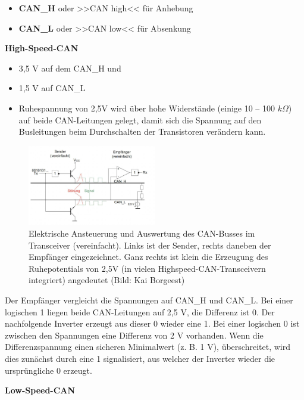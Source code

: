 \begin{itemize}
\item
  \textbf{CAN\_H} oder >>CAN high<< für Anhebung
\item
  \textbf{CAN\_L} oder >>CAN low<< für Absenkung
\end{itemize}

\newpage

\textbf{High-Speed-CAN}

\begin{itemize}
\item
  3,5 V auf dem CAN\_H und
\item
  1,5 V auf CAN\_L
\item
  Ruhespannung von 2,5V wird über hohe Widerstände (einige 10 -- 100
  $k\Omega$) auf beide CAN-Leitungen gelegt, damit sich die Spannung
  auf den Busleitungen beim Durchschalten der Transistoren verändern
  kann.
\end{itemize}

\begin{figure}[!ht]%
\centering
\includegraphics[width=0.5\textwidth]{images/CAN/CAN-6.pdf}
\caption{Elektrische Ansteuerung und Auswertung des CAN-Busses im
Transceiver (vereinfacht). Links ist der Sender, rechts daneben der
Empfänger eingezeichnet. Ganz rechts ist klein die Erzeugung des
Ruhepotentials von 2,5V (in vielen Highspeed-CAN-Transceivern
integriert) angedeutet (Bild: Kai Borgeest)}
\end{figure}

Der Empfänger vergleicht die Spannungen auf CAN\_H und CAN\_L. Bei einer
logischen 1 liegen beide CAN-Leitungen auf 2,5 V, die Differenz ist 0.
Der nachfolgende Inverter erzeugt aus dieser 0 wieder eine 1. Bei einer
logischen 0 ist zwischen den Spannungen eine Differenz von 2 V
vorhanden. Wenn die Differenzspannung einen sicheren Minimalwert (z. B.
1 V), überschreitet, wird dies zunächst durch eine 1 signalisiert, aus
welcher der Inverter wieder die ursprüngliche 0 erzeugt.

\textbf{Low-Speed-CAN}

